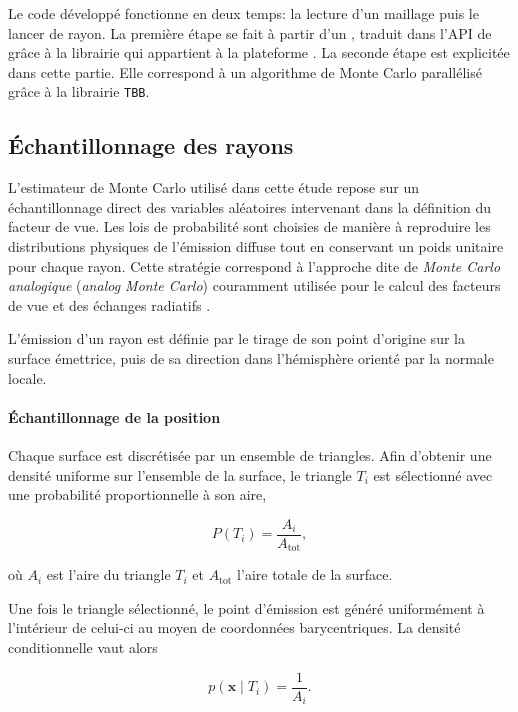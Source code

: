 Le code développé fonctionne en deux temps: la lecture d'un maillage puis le lancer de rayon. La première étape se fait à partir d'un , traduit dans l'API de  grâce à la librairie  qui appartient à la plateforme  \cite{salome}. La seconde étape est explicitée dans cette partie. Elle correspond à un algorithme de Monte Carlo parallélisé grâce à la librairie \texttt{TBB}.

\subsection{Échantillonnage des rayons}

L'estimateur de Monte Carlo utilisé dans cette étude repose sur un échantillonnage direct des variables aléatoires intervenant dans la définition du facteur de vue. Les lois de probabilité sont choisies de manière à reproduire les distributions physiques de l'émission diffuse tout en conservant un poids unitaire pour chaque rayon. Cette stratégie correspond à l'approche dite de \textit{Monte Carlo analogique} (\textit{analog Monte Carlo}) couramment utilisée pour le calcul des facteurs de vue et des échanges radiatifs \cite{howell}.

L'émission d'un rayon est définie par le tirage de son point d'origine sur la surface émettrice, puis de sa direction dans l'hémisphère orienté par la normale locale.

\paragraph{Échantillonnage de la position}

Chaque surface est discrétisée par un ensemble de triangles. Afin d'obtenir une densité uniforme sur l'ensemble de la surface, le triangle $T_i$ est sélectionné avec une probabilité proportionnelle à son aire,

\begin{equation}
P(T_i)=\frac{A_i}{A_{\mathrm{tot}}},
\end{equation}

où $A_i$ est l'aire du triangle $T_i$ et $A_{\mathrm{tot}}$ l'aire totale de la surface.

Une fois le triangle sélectionné, le point d'émission est généré uniformément à l'intérieur de celui-ci au moyen de coordonnées barycentriques. La densité conditionnelle vaut alors

\begin{equation}
p(\mathbf{x}\mid T_i)=\frac{1}{A_i}.
\end{equation}

